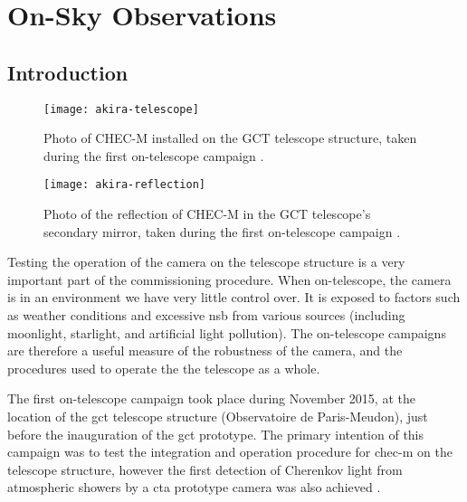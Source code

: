 \chapter{\label{ch8-onsky}On-Sky Observations} 

\minitoc

\section{Introduction}

\begin{figure}
  \centering
  \texttt{[image: akira-telescope]}
  \caption[Photo of CHEC-M installed on the GCT telescope structure.]{Photo of CHEC-M installed on the GCT telescope structure, taken during the first on-telescope campaign \cite{akira-telescope}.}
  \label{fig:akira-telescope}
\end{figure}

\begin{figure}
  \centering
  \texttt{[image: akira-reflection]}
  \caption[Photo of the reflection of CHEC-M in the secondary mirror.]{Photo of the reflection of CHEC-M in the GCT telescope's secondary mirror, taken during the first on-telescope campaign \cite{akira-reflection}.}
  \label{fig:akira-reflection}
\end{figure}

Testing the operation of the camera on the telescope structure is a very important part of the commissioning procedure. When on-telescope, the camera is in an environment we have very little control over. It is exposed to factors such as weather conditions and excessive \gls{nsb} from various sources (including moonlight, starlight, and artificial light pollution). The on-telescope campaigns are therefore a useful measure of the robustness of the camera, and the procedures used to operate the the telescope as a whole.

The first on-telescope campaign took place during November 2015, at the location of the \gls{gct} telescope structure (Observatoire de Paris-Meudon), just before the inauguration of the \gls{gct} prototype. The primary intention of this campaign was to test the integration and operation procedure for \gls{chec-m} on the telescope structure, however the first detection of Cherenkov light from atmospheric showers by a \gls{cta} prototype camera was also achieved \cite{Watson2017}. 

